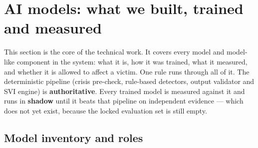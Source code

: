 \section{AI models: what we built, trained and measured}
\label{sec:models}

This section is the core of the technical work. It covers every model and model-like component in
the system: what it is, how it was trained, what it measured, and whether it is allowed to affect a
victim. One rule runs through all of it. The deterministic pipeline (crisis pre-check, rule-based
detectors, output validator and SVI engine) is \textbf{authoritative}. Every trained model is
measured against it and runs in \textbf{shadow} until it beats that pipeline on independent
evidence --- which does not yet exist, because the locked evaluation set is still empty.

\subsection{Model inventory and roles}

